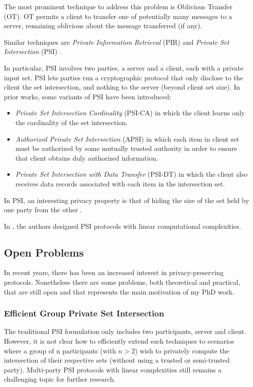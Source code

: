 \documentclass[dvips,12pt]{article}
\begin{document}
The most prominent technique to address this problem is Oblivious Transfer (OT)\cite{oblivious}.
OT permits a client to transfer one of potentially many messages to a server, remaining oblivious about the message transferred (if any).

Similar techniques are \emph{Private Information Retrieval} (PIR) \cite{pir} and \emph{Private Set Intersection} (PSI) \cite{psi}. 

In particular, PSI involves two parties, a server and a client, each with a private input set. PSI
lets parties run a cryptographic protocol that only disclose to the client the set intersection, and
nothing to the server (beyond client set size).
In prior works, some variants of PSI have been introduced:
\begin{itemize}
\item \emph{Private Set Intersection Cardinality} (PSI-CA) in which the client learns only the cardinality of the set intersection.
\item \emph{Authorized Private Set Intersection} (APSI) in which each item in client set must be authorized by some mutually trusted authority in order to ensure that client obtains duly authorized information.
\item \emph{Private Set Intersection with Data Transfer} (PSI-DT) in which the client also receives data records associated with each item in the intersection set.
\end{itemize}

In PSI, an interesting privacy property is that of hiding the size of the set held by one party from the other \cite{size-psi}.

In \cite{lin-psi,linear-psi}, the authors designed PSI protocols with linear computational complexities.

\subsection{Open Problems}
In recent years, there has been an increased interest in privacy-preserving protocols. 
Nonetheless there are some problems, both theoretical and practical, that are still open and that represents the main motivation of my PhD work.
\subsubsection{Efficient Group Private Set Intersection}
The traditional PSI formulation only includes two participants, server and client. However, it is not clear how to efficiently extend such techniques to scenarios where a group of n participants (with $n > 2$) wish to privately compute the intersection of their respective sets (without using a trusted or semi-trusted party). Multi-party PSI protocols with linear complexities still remains a challenging topic for further research.
\end{document}
